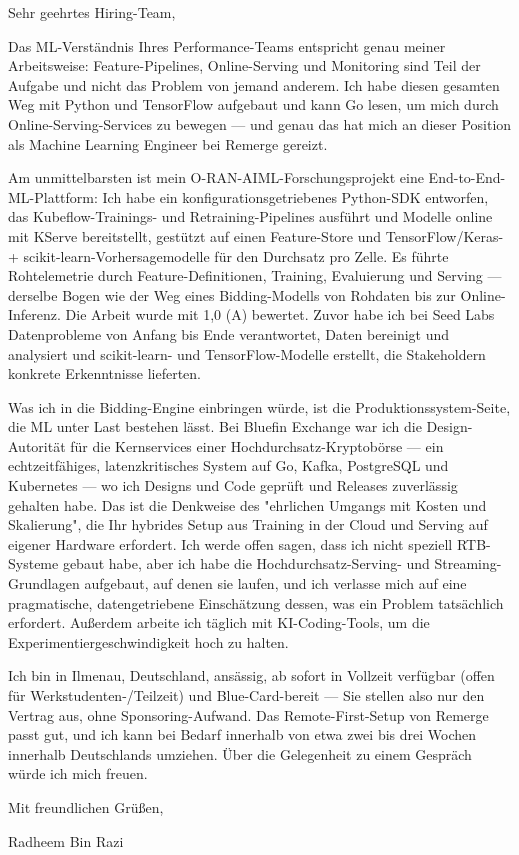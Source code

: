 \documentclass[11pt,a4paper]{coverletter}
\begin{document}

\opening{Sehr geehrtes Hiring-Team,}

Das ML-Verständnis Ihres Performance-Teams entspricht genau meiner Arbeitsweise: Feature-Pipelines, Online-Serving und Monitoring sind Teil der Aufgabe und nicht das Problem von jemand anderem. Ich habe diesen gesamten Weg mit Python und TensorFlow aufgebaut und kann Go lesen, um mich durch Online-Serving-Services zu bewegen — und genau das hat mich an dieser Position als Machine Learning Engineer bei Remerge gereizt.

Am unmittelbarsten ist mein O-RAN-AIML-Forschungsprojekt eine End-to-End-ML-Plattform: Ich habe ein konfigurationsgetriebenes Python-SDK entworfen, das Kubeflow-Trainings- und Retraining-Pipelines ausführt und Modelle online mit KServe bereitstellt, gestützt auf einen Feature-Store und TensorFlow/Keras- + scikit-learn-Vorhersagemodelle für den Durchsatz pro Zelle. Es führte Rohtelemetrie durch Feature-Definitionen, Training, Evaluierung und Serving — derselbe Bogen wie der Weg eines Bidding-Modells von Rohdaten bis zur Online-Inferenz. Die Arbeit wurde mit 1,0 (A) bewertet. Zuvor habe ich bei Seed Labs Datenprobleme von Anfang bis Ende verantwortet, Daten bereinigt und analysiert und scikit-learn- und TensorFlow-Modelle erstellt, die Stakeholdern konkrete Erkenntnisse lieferten.

Was ich in die Bidding-Engine einbringen würde, ist die Produktionssystem-Seite, die ML unter Last bestehen lässt. Bei Bluefin Exchange war ich die Design-Autorität für die Kernservices einer Hochdurchsatz-Kryptobörse — ein echtzeitfähiges, latenzkritisches System auf Go, Kafka, PostgreSQL und Kubernetes — wo ich Designs und Code geprüft und Releases zuverlässig gehalten habe. Das ist die Denkweise des "ehrlichen Umgangs mit Kosten und Skalierung", die Ihr hybrides Setup aus Training in der Cloud und Serving auf eigener Hardware erfordert. Ich werde offen sagen, dass ich nicht speziell RTB-Systeme gebaut habe, aber ich habe die Hochdurchsatz-Serving- und Streaming-Grundlagen aufgebaut, auf denen sie laufen, und ich verlasse mich auf eine pragmatische, datengetriebene Einschätzung dessen, was ein Problem tatsächlich erfordert. Außerdem arbeite ich täglich mit KI-Coding-Tools, um die Experimentiergeschwindigkeit hoch zu halten.

Ich bin in Ilmenau, Deutschland, ansässig, ab sofort in Vollzeit verfügbar (offen für Werkstudenten-/Teilzeit) und Blue-Card-bereit — Sie stellen also nur den Vertrag aus, ohne Sponsoring-Aufwand. Das Remote-First-Setup von Remerge passt gut, und ich kann bei Bedarf innerhalb von etwa zwei bis drei Wochen innerhalb Deutschlands umziehen. Über die Gelegenheit zu einem Gespräch würde ich mich freuen.

\closing{Mit freundlichen Grüßen,}{Radheem Bin Razi}
\end{document}
